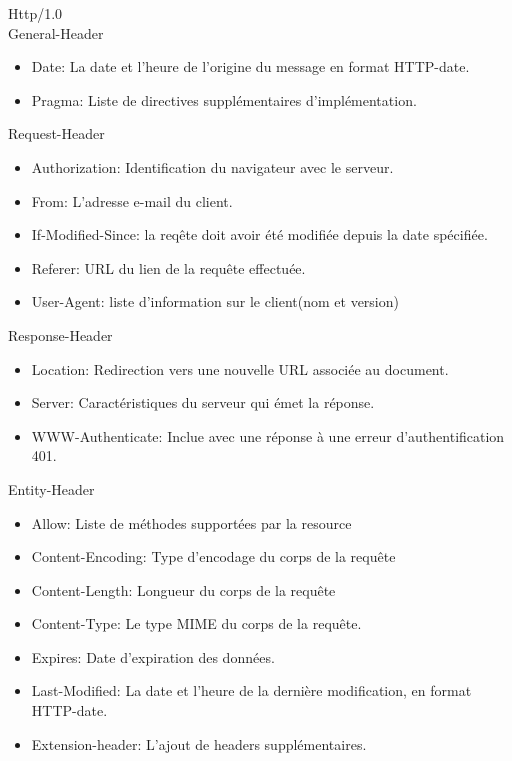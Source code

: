 \documentclass{scrreprt}
\begin{document}
Http/1.0\\
    General-Header\\
        \begin{itemize}
        \item Date: La date et l'heure de l'origine du message en format HTTP-date.
        \item Pragma: Liste de directives supplémentaires d'implémentation.
        \end{itemize}
    Request-Header\\
        \begin{itemize}
        \item Authorization: Identification du navigateur avec le serveur.
        \item From: L'adresse e-mail du client.      
        \item If-Modified-Since: la reqête doit avoir été modifiée depuis la date spécifiée.
        \item Referer: URL du lien de la requête effectuée.          
        \item User-Agent: liste d'information sur le client(nom et version)       
        \end{itemize}
    Response-Header\\
        \begin{itemize}
        \item Location: Redirection vers une nouvelle URL associée au document.           
        \item Server: Caractéristiques du serveur qui émet la réponse.          
        \item WWW-Authenticate: Inclue avec une réponse à une erreur d'authentification 401.
        \end{itemize}
    Entity-Header\\
        \begin{itemize}
        \item Allow: Liste de méthodes supportées par la resource                
        \item Content-Encoding: Type d'encodage du corps de la requête  
        \item Content-Length: Longueur du corps de la requête    
        \item Content-Type: Le type MIME du corps de la requête.      
        \item Expires: Date d'expiration des données.           
        \item Last-Modified: La date et l'heure de la dernière modification, en format HTTP-date.     
        \item Extension-header: L'ajout de headers supplémentaires.
        \end{itemize}
\end{document}
